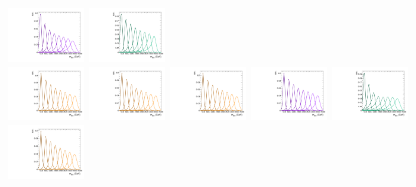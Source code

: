 \begin{figure}[htbp]
  \includegraphics[width=0.18\textwidth]{fig/analysis/templateSignalVsMX_fromDC_WprToWZ_MVV_mu_LP_bb_DEtaHi.pdf}
  \includegraphics[width=0.18\textwidth]{fig/analysis/templateSignalVsMX_fromDC_WprToWH_MVV_mu_LP_bb_DEtaHi.pdf}\\
  \includegraphics[width=0.18\textwidth]{fig/analysis/templateSignalVsMX_fromDC_GbuToWW_MVV_mu_HP_nobb_DEtaHi.pdf}
  \includegraphics[width=0.18\textwidth]{fig/analysis/templateSignalVsMX_fromDC_RadToWW_MVV_mu_HP_nobb_DEtaHi.pdf}
  \includegraphics[width=0.18\textwidth]{fig/analysis/templateSignalVsMX_fromDC_ZprToWW_MVV_mu_HP_nobb_DEtaHi.pdf}
  \includegraphics[width=0.18\textwidth]{fig/analysis/templateSignalVsMX_fromDC_WprToWZ_MVV_mu_HP_nobb_DEtaHi.pdf}
  \includegraphics[width=0.18\textwidth]{fig/analysis/templateSignalVsMX_fromDC_WprToWH_MVV_mu_HP_nobb_DEtaHi.pdf}\\
  \includegraphics[width=0.18\textwidth]{fig/analysis/templateSignalVsMX_fromDC_GbuToWW_MVV_mu_LP_nobb_DEtaHi.pdf}

\end{figure}

